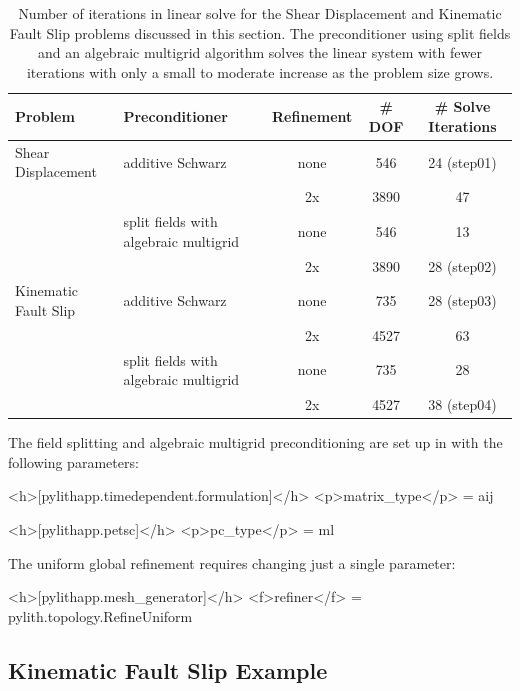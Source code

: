 \begin{table}[htbp]
  \caption{Number of iterations in linear solve for the Shear
    Displacement and Kinematic Fault Slip problems discussed in this
    section. The preconditioner using split fields and an algebraic
    multigrid algorithm solves the linear system with fewer iterations
    with only a small to moderate increase as the problem size grows.}
\label{tab:3dtet4:solver:cmp}
\begin{tabular}{lp{2.0in}ccc}
\textbf{Problem} & \textbf{Preconditioner} & \textbf{Refinement} & \textbf{\# DOF} & \textbf{\# Solve Iterations}\\
\hline 
Shear Displacement & additive Schwarz & none & 546 & 24 (step01) \\
 &  & 2x  & 3890 & 47 \\
 & split fields with algebraic multigrid & none & 546 & 13 \\
 &  & 2x  & 3890 & 28 (step02)\\
Kinematic Fault Slip & additive Schwarz & none & 735 & 28 (step03) \\
 &  & 2x  & 4527 & 63\\
 & split fields with algebraic multigrid & none & 735 & 28 \\
 &  & 2x  & 4527 & 38 (step04) \\
\hline 
\end{tabular}
\end{table}

The field splitting and algebraic multigrid preconditioning are set
up in  with the following parameters:
\begin{cfg}
<h>[pylithapp.timedependent.formulation]</h>
<p>matrix_type</p> = aij

<h>[pylithapp.petsc]</h>
<p>pc_type</p> = ml
\end{cfg}
The uniform global refinement requires changing just a single parameter:
\begin{cfg}
<h>[pylithapp.mesh_generator]</h>
<f>refiner</f> = pylith.topology.RefineUniform
\end{cfg}

\subsection{Kinematic Fault Slip Example}

